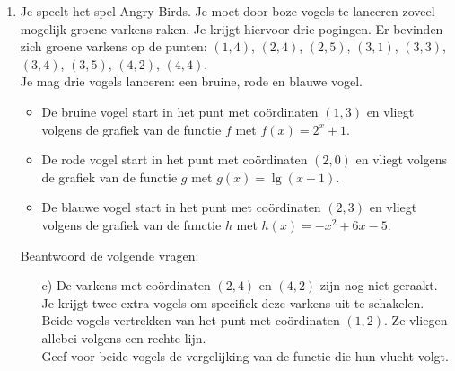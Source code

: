 \begin{frame}
\small{
\begin{enumerate}
\item<+->[3]
Je speelt het spel Angry Birds. Je moet door boze vogels te lanceren zoveel mogelijk groene varkens raken. Je krijgt hiervoor drie pogingen. Er bevinden zich groene varkens op de punten: $(1,4)$, $(2,4)$, $(2,5)$, $(3,1)$, $(3,3)$, $(3,4)$, $(3,5)$, $(4,2)$, $(4,4)$. \\
Je mag drie vogels lanceren: een bruine, rode en blauwe vogel. 
\begin{itemize}
\item De bruine vogel start in het punt met co\"ordinaten $(1,3)$ en vliegt volgens de grafiek van de functie $f$ met $f(x)= 2^x+1$.
\item De rode vogel start in het punt met co\"ordinaten $(2,0)$ en vliegt volgens de grafiek van de functie $g$ met $g(x)=\lg (x-1)$.
\item De blauwe vogel start in het punt met co\"ordinaten $(2,3)$ en vliegt volgens de grafiek van de functie $h$ met $h(x)=-x^2+6x-5$.
\end{itemize}

Beantwoord de volgende vragen:
\begin{enumerate}
\item[c)] De varkens met co\"ordinaten $(2,4)$ en $(4,2)$ zijn nog niet geraakt. Je krijgt twee extra vogels om specifiek deze varkens uit te schakelen. Beide vogels vertrekken van het punt met co\"ordinaten $(1,2)$. Ze vliegen allebei volgens een rechte lijn. \\
Geef voor beide vogels de vergelijking van de functie die hun vlucht volgt.
\end{enumerate}
\end{enumerate}}
\end{frame}